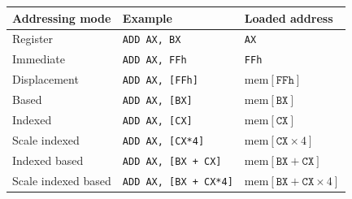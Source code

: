 \documentclass[a4paper,11pt]{article}
\begin{document}
\begin{table}
	\centering
	\begin{tabular}{lll}
		\hline
		\textbf{Addressing mode} & \textbf{Example}             & \textbf{Loaded address}                            \\
		\hline
		Register                 & \texttt{ADD AX, BX}          & \texttt{AX}                                        \\
		Immediate                & \texttt{ADD AX, FFh}         & \texttt{FFh}                                       \\
		Displacement             & \texttt{ADD AX, [FFh]}       & $\mathrm{mem}[\texttt{FFh}]$                       \\
		Based                    & \texttt{ADD AX, [BX]}        & $\mathrm{mem}[\texttt{BX}]$                        \\
		Indexed                  & \texttt{ADD AX, [CX]}        & $\mathrm{mem}[\texttt{CX}]$                        \\
		Scale indexed            & \texttt{ADD AX, [CX*4]}      & $\mathrm{mem}[\texttt{CX} \times 4]$               \\
		Indexed based            & \texttt{ADD AX, [BX + CX]}   & $\mathrm{mem}[\texttt{BX} + \texttt{CX}]$          \\
		Scale indexed based      & \texttt{ADD AX, [BX + CX*4]} & $\mathrm{mem}[\texttt{BX} + \texttt{CX} \times 4]$ \\
		\hline
	\end{tabular}
\end{table}
\end{document}
